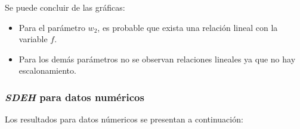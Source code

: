     Se puede concluir de las gráficas:
\begin{itemize}
    \item Para el parámetro $w_2$, es probable que exista una
relación lineal con la variable $f$.
    \item Para los demás parámetros no se observan relaciones
lineales ya que no hay escalonamiento.
\end{itemize}

\subsubsection{\emph{SDEH} para datos numéricos}

    Los resultados para datos númericos se presentan a continuación:

\begin{figure}[H]
  \centering
  \label{fig:f_sde_csv1}
\end{figure}

